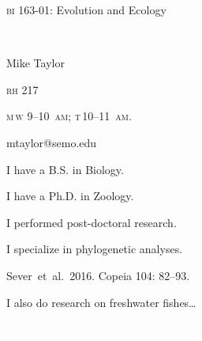\documentclass[t]{beamer}
\begin{document}
%
{
\begin{frame}[b]{\textcolor{orange7}{\textsc{bi} 163-01: Evolution and Ecology}}


\hfill\textcolor{white}{\tiny Fir0002, Wikimedia }
\end{frame}
}
%
{
\begin{frame}[t]
	\large
	\vspace{5ex}
	\hangpara\hspace{17em} Mike Taylor

	\hangpara\hspace{17em} \textsc{rh} 217

	\hangpara\hspace{17em} \textsc{m}\,\textsc{w} 9--10~\textsc{am}; \textsc{t}\,10--11~\textsc{am}.

	\hangpara\hspace{17em} mtaylor@semo.edu

\end{frame}
}
%
{
\begin{frame}[t]{I have a B.S. in Biology.}
		
\end{frame}
}
%
{
	\begin{frame}[t]{I have a Ph.D. in Zoology.}
		
	\end{frame}
}
%
{
	\begin{frame}[t]{I performed post-doctoral research.}
		
	\end{frame}
}
%
{
	\begin{frame}[t]{I specialize in phylogenetic analyses.}
		
		\vfilll
		
		\hfill \tiny Sever~et~al.~2016. Copeia 104: 82–93.
	\end{frame}
}
%
{
	\begin{frame}[t]{I also do research on freshwater fishes\dots}
		
		\vfilll
		
		\hfill \tiny \textcolor{white}{Michael S. Taylor }
	\end{frame}
}
\end{document}
